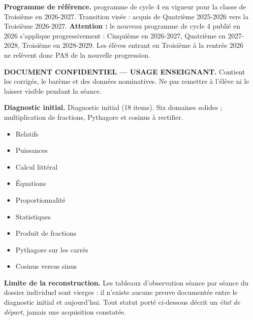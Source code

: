 \documentclass[10pt,a4paper]{article}
\begin{document}
\begin{methodbox}\small\textbf{Programme de référence.} programme de cycle 4 en vigueur pour la classe de Troisième en 2026-2027. Transition visée : acquis de Quatrième 2025-2026 vers la Troisième 2026-2027. \textbf{Attention :} le nouveau programme de cycle 4 publié en 2026 s'applique progressivement : Cinquième en 2026-2027, Quatrième en 2027-2028, Troisième en 2028-2029. Les élèves entrant en Troisième à la rentrée 2026 ne relèvent donc PAS de la nouvelle progression.\end{methodbox}
\begin{keybox}\textbf{DOCUMENT CONFIDENTIEL --- USAGE ENSEIGNANT.} Contient les corrigés, le barème et des données nominatives. Ne pas remettre à l'élève ni le laisser visible pendant la séance.\end{keybox}
\begin{methodbox}
\textbf{Diagnostic initial.} Diagnostic initial (18 items). Six domaines solides ; multiplication de fractions, Pythagore et cosinus à rectifier.
\end{methodbox}
\begin{itemize}\item Relatifs\item Puissances\item Calcul littéral\item Équations\item Proportionnalité\item Statistiques\end{itemize}
\begin{itemize}\item Produit de fractions\item Pythagore sur les carrés\item Cosinus versus sinus\end{itemize}
\begin{warningbox}\textbf{Limite de la reconstruction.} Les tableaux d'observation séance par séance du dossier individuel sont vierges : il n'existe aucune preuve documentée entre le diagnostic initial et aujourd'hui. Tout statut porté ci-dessous décrit un \emph{état de départ}, jamais une acquisition constatée.\end{warningbox}
\newpage{}
\end{document}
